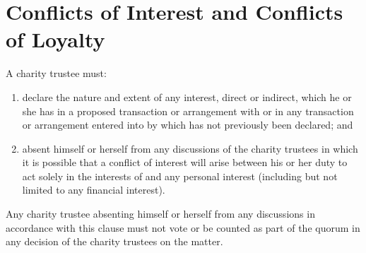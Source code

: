 \section{Conflicts of Interest and Conflicts of Loyalty}
\label{sec:conflicts}
A charity trustee must:
\begin{enumerate}
    \item declare the nature and extent of any interest, direct or indirect, which he or she has in a proposed transaction or arrangement with \shortname{} or in any transaction or arrangement entered into by \shortname{} which has not previously been declared; and
    \item absent himself or herself from any discussions of the charity trustees in which it is possible that a conflict of interest will arise between his or her duty to act solely in the interests of \shortname{} and any personal interest (including but not limited to any  financial interest).
\end{enumerate}
Any charity trustee absenting himself or herself from any discussions in accordance with this clause must not vote or be counted as part of the quorum in any decision of the charity trustees on the matter.
